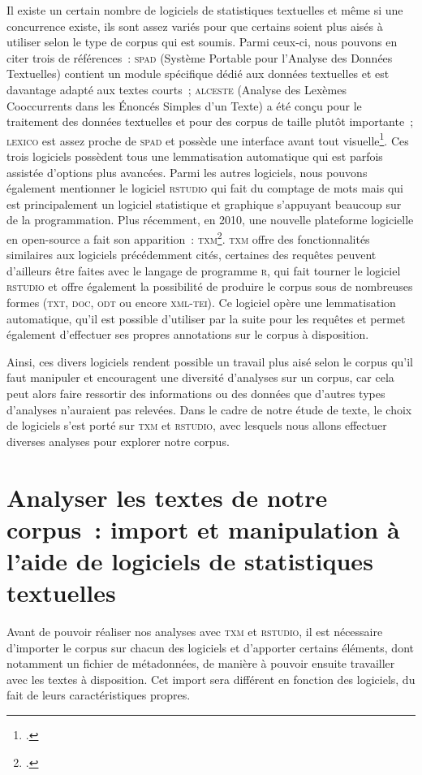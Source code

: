 Il existe un certain nombre de logiciels de statistiques textuelles et même si une concurrence existe, ils sont assez variés pour que certains soient plus aisés à utiliser selon le type de corpus qui est soumis. Parmi ceux-ci, nous pouvons en citer trois de références~: \textsc{spad} (Système Portable pour l'Analyse des Données Textuelles) contient un module spécifique dédié aux données textuelles et est davantage adapté aux textes courts~; \textsc{alceste} (Analyse des Lexèmes Cooccurrents dans les Énoncés Simples d'un Texte) a été conçu pour le traitement des données textuelles et pour des corpus de taille plutôt importante~; \textsc{lexico} est assez proche de \textsc{spad} et possède une interface avant tout visuelle\footcite[p.~33-36]{stat_text_garnier}. Ces trois logiciels possèdent tous une lemmatisation automatique qui est parfois assistée d'options plus avancées. Parmi les autres logiciels, nous pouvons également mentionner le logiciel \textsc{rstudio} qui fait du comptage de mots mais qui est principalement un logiciel statistique et graphique s'appuyant beaucoup sur de la programmation. Plus récemment, en 2010, une nouvelle plateforme logicielle en open-source a fait son apparition~: \textsc{txm}\footcite{txm_plateforme}. \textsc{txm} offre des fonctionnalités similaires aux logiciels précédemment cités, certaines des requêtes peuvent d'ailleurs être faites avec le langage de programme \textsc{r}, qui fait tourner le logiciel \textsc{rstudio} et offre également la possibilité de produire le corpus sous de nombreuses formes (\textsc{txt}, \textsc{doc}, \textsc{odt} ou encore \textsc{xml-tei}). Ce logiciel opère une lemmatisation automatique, qu'il est possible d'utiliser par la suite pour les requêtes et permet également d'effectuer ses propres annotations sur le corpus à disposition.

Ainsi, ces divers logiciels rendent possible un travail plus aisé selon le corpus qu'il faut manipuler et encouragent une diversité d'analyses sur un corpus, car cela peut alors faire ressortir des informations ou des données que d'autres types d'analyses n'auraient pas relevées.  Dans le cadre de notre étude de texte, le choix de logiciels s'est porté sur \textsc{txm} et \textsc{rstudio}, avec lesquels nous allons effectuer diverses analyses pour explorer notre corpus.

\section{Analyser les textes de notre corpus~: import et manipulation à l'aide de logiciels de statistiques textuelles}
Avant de pouvoir réaliser nos analyses avec \textsc{txm} et \textsc{rstudio}, il est nécessaire d'importer le corpus sur chacun des logiciels et d'apporter certains éléments, dont notamment un fichier de métadonnées, de manière à pouvoir ensuite travailler avec les textes à disposition. Cet import sera différent en fonction des logiciels, du fait de leurs caractéristiques propres.

